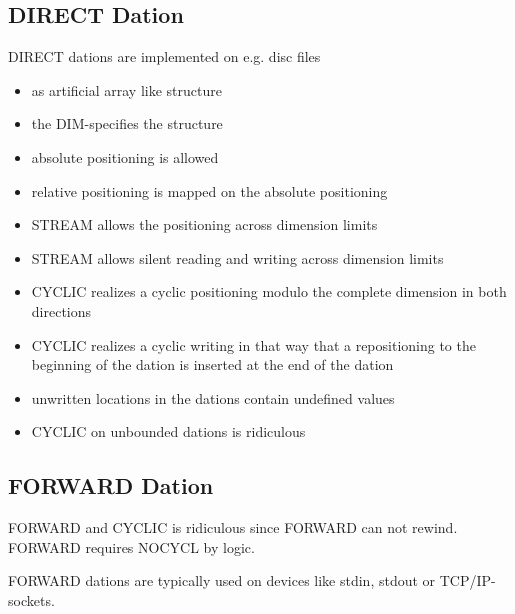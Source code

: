 \subsection{DIRECT Dation}
DIRECT dations are implemented on e.g. disc files
\begin{itemize}
\item    as artificial array like structure
\item    the DIM-specifies the structure
\item    absolute positioning is allowed
\item    relative positioning is mapped on the absolute positioning
\item    STREAM allows the positioning across dimension limits
\item    STREAM allows silent reading and writing across dimension limits
 \item   CYCLIC realizes a cyclic positioning modulo the complete
        dimension in both directions
\item    CYCLIC realizes a cyclic writing in that way that a
          repositioning to the beginning of the dation is inserted
          at the end of the dation
\item    unwritten locations in the dations contain undefined values
\item    CYCLIC on unbounded dations is ridiculous
\end{itemize}

\subsection{FORWARD Dation}
FORWARD and CYCLIC is ridiculous since FORWARD can not rewind.
FORWARD requires NOCYCL by logic.

FORWARD dations are typically used on devices like stdin, 
stdout or TCP/IP-sockets.

